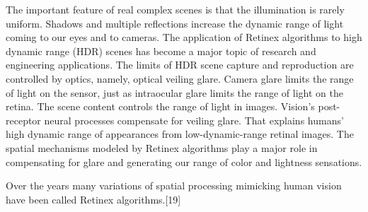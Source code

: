 The important feature of real complex scenes is that the illumination is rarely uniform. Shadows and multiple reflections increase the dynamic range of light coming to our eyes and to cameras. The application of Retinex algorithms to high dynamic range (HDR) scenes has become a major topic of research and engineering applications. The limits of HDR scene capture and reproduction are controlled by optics, namely, optical veiling glare. Camera glare limits the range of light on the sensor, just as intraocular glare limits the range of light on the retina. The scene content controls the range of light in images. Vision’s post-receptor neural processes compensate for veiling glare. That explains humans’ high dynamic range of appearances from low-dynamic-range retinal images. The spatial mechanisms modeled by Retinex algorithms play a major role in compensating for glare and generating our range of color and lightness sensations.

Over the years many variations of spatial processing mimicking human vision have been called Retinex algorithms.[19]

